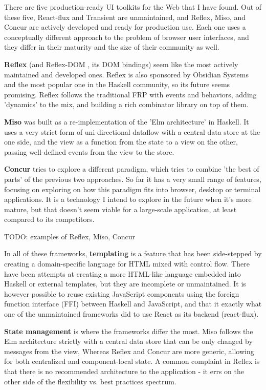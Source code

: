 \documentclass[english,odsaz]{fitthesis}
\begin{document}
There are five production-ready UI toolkits for the Web that I have found. Out
of these five, React-flux and Transient are unmaintained, and Reflex, Miso, and
Concur are actively developed and ready for production use. Each one uses a
conceptually different approach to the problem of browser user interfaces, and
they differ in their maturity and the size of their community as well.

\textbf{Reflex} \cite{reflex} (and Reflex-DOM \cite{reflex-dom}, its DOM bindings) seem like
the most actively maintained and developed ones. Reflex is also sponsored by
Obsidian Systems \cite{obsidian} and the most popular one in the Haskell
community, so its future seems promising. Reflex follows the traditional FRP
with events and behaviors, adding 'dynamics' to the mix, and building a rich
combinator library on top of them.

\textbf{Miso} \cite{miso} was built as a re-implementation of the 'Elm architecture' in
Haskell. It uses a very strict form of uni-directional dataflow with a central
data store at the one side, and the view as a function from the state to a view
on the other, passing well-defined events from the view to the store.

\textbf{Concur} \cite{concur} tries to explore a different paradigm, which tries to combine
'the best of parts' of the previous two approaches. So far it has a very small
range of features, focusing on exploring on how this paradigm fits into browser,
desktop or terminal applications. It is a technology I intend to explore in the
future when it's more mature, but that doesn't seem viable for a large-scale
application, at least compared to its competitors.

TODO: examples of Reflex, Miso, Concur

In all of these frameworks, \textbf{templating} is a feature that has been side-stepped
by creating a domain-specific language for HTML mixed with control flow. There
have been attempts at creating a more HTML-like language embedded into Haskell
or external templates, but they are incomplete or unmaintained. It is however
possible to reuse existing JavaScript components using the foreign function
interface (FFI) between Haskell and JavaScript, and that it exactly what one of
the unmaintained frameworks did to use React as its backend (react-flux).

\textbf{State management} is where the frameworks differ the most. Miso follows the Elm
architecture strictly with a central data store that can be only changed by
messages from the view, Whereas Reflex and Concur are more generic, allowing for
both centralized and component-local state. A common complaint in Reflex is that
there is no recommended architecture to the application - it errs on the other
side of the flexibility vs. best practices spectrum.
\end{document}
